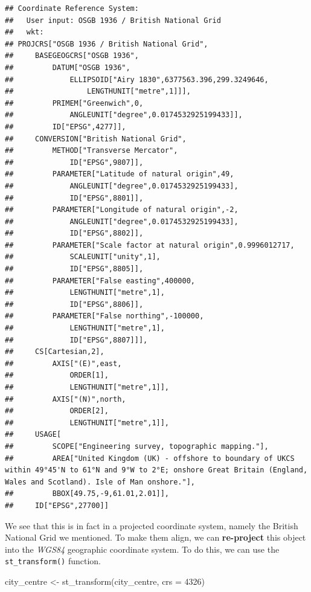 \documentclass[
  krantz2]{krantz}
\makeatletter
\newenvironment{Shaded}{\begin{snugshade}}{\end{snugshade}}
\newcommand{\AttributeTok}[1]{\textcolor[rgb]{0.61,0.61,0.61}{#1}}
\newcommand{\DecValTok}[1]{\textcolor[rgb]{0.06,0.06,0.06}{#1}}
\newcommand{\FunctionTok}[1]{\textcolor[rgb]{0,0,0}{#1}}
\newcommand{\NormalTok}[1]{#1}
\newcommand{\OtherTok}[1]{\textcolor[rgb]{0.37,0.37,0.37}{#1}}
\newenvironment{kframe}{%
\medskip{}
\setlength{\fboxsep}{.8em}
 \def\at@end@of@kframe{}%
 \ifinner\ifhmode%
  \def\at@end@of@kframe{\end{minipage}}%
  \begin{minipage}{\columnwidth}%
 \fi\fi%
 \def\FrameCommand##1{\hskip\@totalleftmargin \hskip-\fboxsep
 \colorbox{shadecolor}{##1}\hskip-\fboxsep
     \hskip-\linewidth \hskip-\@totalleftmargin \hskip\columnwidth}%
 \MakeFramed {\advance\hsize-\width
   \@totalleftmargin\z@ \linewidth\hsize
   \@setminipage}}%
 {\par\unskip\endMakeFramed%
 \at@end@of@kframe}
\renewenvironment{Shaded}{\begin{kframe}}{\end{kframe}}
\makeatother
\begin{document}
\begin{verbatim}
## Coordinate Reference System:
##   User input: OSGB 1936 / British National Grid 
##   wkt:
## PROJCRS["OSGB 1936 / British National Grid",
##     BASEGEOGCRS["OSGB 1936",
##         DATUM["OSGB 1936",
##             ELLIPSOID["Airy 1830",6377563.396,299.3249646,
##                 LENGTHUNIT["metre",1]]],
##         PRIMEM["Greenwich",0,
##             ANGLEUNIT["degree",0.0174532925199433]],
##         ID["EPSG",4277]],
##     CONVERSION["British National Grid",
##         METHOD["Transverse Mercator",
##             ID["EPSG",9807]],
##         PARAMETER["Latitude of natural origin",49,
##             ANGLEUNIT["degree",0.0174532925199433],
##             ID["EPSG",8801]],
##         PARAMETER["Longitude of natural origin",-2,
##             ANGLEUNIT["degree",0.0174532925199433],
##             ID["EPSG",8802]],
##         PARAMETER["Scale factor at natural origin",0.9996012717,
##             SCALEUNIT["unity",1],
##             ID["EPSG",8805]],
##         PARAMETER["False easting",400000,
##             LENGTHUNIT["metre",1],
##             ID["EPSG",8806]],
##         PARAMETER["False northing",-100000,
##             LENGTHUNIT["metre",1],
##             ID["EPSG",8807]]],
##     CS[Cartesian,2],
##         AXIS["(E)",east,
##             ORDER[1],
##             LENGTHUNIT["metre",1]],
##         AXIS["(N)",north,
##             ORDER[2],
##             LENGTHUNIT["metre",1]],
##     USAGE[
##         SCOPE["Engineering survey, topographic mapping."],
##         AREA["United Kingdom (UK) - offshore to boundary of UKCS within 49°45'N to 61°N and 9°W to 2°E; onshore Great Britain (England, Wales and Scotland). Isle of Man onshore."],
##         BBOX[49.75,-9,61.01,2.01]],
##     ID["EPSG",27700]]
\end{verbatim}

We see that this is in fact in a projected coordinate system, namely the British National Grid we mentioned. To make them align, we can \textbf{re-project} this object into the \emph{WGS84} geographic coordinate system. To do this, we can use the \texttt{st\_transform()} function.

\begin{Shaded}
\begin{Highlighting}[]
\NormalTok{city\_centre }\OtherTok{\textless{}{-}} \FunctionTok{st\_transform}\NormalTok{(city\_centre, }\AttributeTok{crs =} \DecValTok{4326}\NormalTok{)}
\end{Highlighting}
\end{Shaded}
\end{document}
